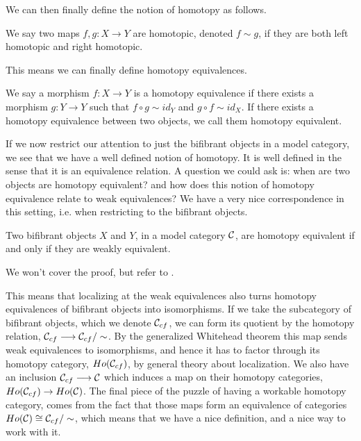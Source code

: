 We can then finally define the notion of homotopy as follows. 

\begin{definition}
\label{def:homotopic_maps}
We say two maps $f,g:X\rightarrow Y$ are homotopic, denoted $f\sim g$, if they are both left homotopic and right homotopic.
\end{definition}

This means we can finally define homotopy equivalences. 

\begin{definition}
\label{def:homotopy_equivalence}
We say a morphism $f\colon X\longrightarrow Y$ is a homotopy equivalence if there exists a morphism $g\colon Y\longrightarrow Y$ such that $f\circ g \sim id_Y$ and $g\circ f \sim id_X$. If there exists a homotopy equivalence between two objects, we call them homotopy equivalent.
\end{definition}

If we now restrict our attention to just the bifibrant objects in a model category, we see that we have a well defined notion of homotopy. It is well defined in the sense that it is an equivalence relation. A question we could ask is: when are two objects are homotopy equivalent? and how does this notion of homotopy equivalence relate to weak equivalences? We have a very nice correspondence in this setting, i.e. when restricting to the bifibrant objects. 

\begin{theorem}
\label{thm:whitehead}
Two bifibrant objects $X$ and $Y$, in a model category $\mathcal{C}$, are homotopy equivalent if and only if they are weakly equivalent. 
\end{theorem}

We won't cover the proof, but refer to \cite[Theorem 1.2.10.]{hovey}. 

This means that localizing at the weak equivalences also turns homotopy equivalences of bifibrant objects into isomorphisms. If we take the subcategory of bifibrant objects, which we denote $\mathcal{C}_{cf}$, we can form its quotient by the homotopy relation, $\mathcal{C}_{cf}\longrightarrow \mathcal{C}_{cf}/\sim$. By the generalized Whitehead theorem this map sends weak equivalences to isomorphisms, and hence it has to factor through its homotopy category, $Ho(\mathcal{C}_{cf})$, by general theory about localization. We also have an inclusion $\mathcal{C}_{cf} \longrightarrow \mathcal{C}$ which induces a map on their homotopy categories, $Ho(\mathcal{C}_{cf})\rightarrow Ho(\mathcal{C})$. The final piece of the puzzle of having a workable homotopy category, comes from the fact that those maps form an equivalence of categories $Ho(\mathcal{C})\cong \mathcal{C}_{cf}/\sim$, which means that we have a nice definition, and a nice way to work with it.











